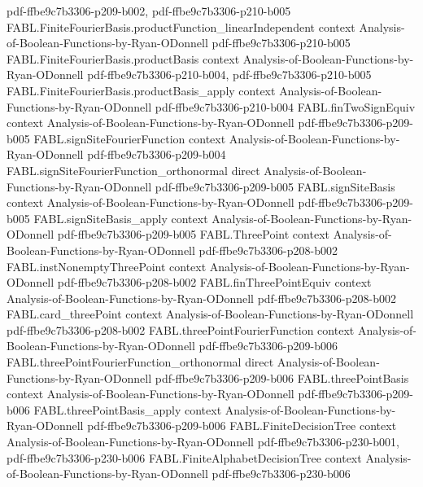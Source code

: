\begin{theorem}
  {pdf-ffbe9c7b3306-p209-b002,
    pdf-ffbe9c7b3306-p210-b005}
\proofstep
  {FABL.FiniteFourierBasis.productFunction_linearIndependent}
  {context}
  {Analysis-of-Boolean-Functions-by-Ryan-ODonnell}
  {pdf-ffbe9c7b3306-p210-b005}
\proofstep
  {FABL.FiniteFourierBasis.productBasis}
  {context}
  {Analysis-of-Boolean-Functions-by-Ryan-ODonnell}
  {pdf-ffbe9c7b3306-p210-b004,
    pdf-ffbe9c7b3306-p210-b005}
\proofstep
  {FABL.FiniteFourierBasis.productBasis_apply}
  {context}
  {Analysis-of-Boolean-Functions-by-Ryan-ODonnell}
  {pdf-ffbe9c7b3306-p210-b004}
\proofstep
  {FABL.finTwoSignEquiv}
  {context}
  {Analysis-of-Boolean-Functions-by-Ryan-ODonnell}
  {pdf-ffbe9c7b3306-p209-b005}
\proofstep
  {FABL.signSiteFourierFunction}
  {context}
  {Analysis-of-Boolean-Functions-by-Ryan-ODonnell}
  {pdf-ffbe9c7b3306-p209-b004}
\proofstep
  {FABL.signSiteFourierFunction_orthonormal}
  {direct}
  {Analysis-of-Boolean-Functions-by-Ryan-ODonnell}
  {pdf-ffbe9c7b3306-p209-b005}
\proofstep
  {FABL.signSiteBasis}
  {context}
  {Analysis-of-Boolean-Functions-by-Ryan-ODonnell}
  {pdf-ffbe9c7b3306-p209-b005}
\proofstep
  {FABL.signSiteBasis_apply}
  {context}
  {Analysis-of-Boolean-Functions-by-Ryan-ODonnell}
  {pdf-ffbe9c7b3306-p209-b005}
\proofstep
  {FABL.ThreePoint}
  {context}
  {Analysis-of-Boolean-Functions-by-Ryan-ODonnell}
  {pdf-ffbe9c7b3306-p208-b002}
\proofstep
  {FABL.instNonemptyThreePoint}
  {context}
  {Analysis-of-Boolean-Functions-by-Ryan-ODonnell}
  {pdf-ffbe9c7b3306-p208-b002}
\proofstep
  {FABL.finThreePointEquiv}
  {context}
  {Analysis-of-Boolean-Functions-by-Ryan-ODonnell}
  {pdf-ffbe9c7b3306-p208-b002}
\proofstep
  {FABL.card_threePoint}
  {context}
  {Analysis-of-Boolean-Functions-by-Ryan-ODonnell}
  {pdf-ffbe9c7b3306-p208-b002}
\proofstep
  {FABL.threePointFourierFunction}
  {context}
  {Analysis-of-Boolean-Functions-by-Ryan-ODonnell}
  {pdf-ffbe9c7b3306-p209-b006}
\proofstep
  {FABL.threePointFourierFunction_orthonormal}
  {direct}
  {Analysis-of-Boolean-Functions-by-Ryan-ODonnell}
  {pdf-ffbe9c7b3306-p209-b006}
\proofstep
  {FABL.threePointBasis}
  {context}
  {Analysis-of-Boolean-Functions-by-Ryan-ODonnell}
  {pdf-ffbe9c7b3306-p209-b006}
\proofstep
  {FABL.threePointBasis_apply}
  {context}
  {Analysis-of-Boolean-Functions-by-Ryan-ODonnell}
  {pdf-ffbe9c7b3306-p209-b006}
\proofstep
  {FABL.FiniteDecisionTree}
  {context}
  {Analysis-of-Boolean-Functions-by-Ryan-ODonnell}
  {pdf-ffbe9c7b3306-p230-b001,
    pdf-ffbe9c7b3306-p230-b006}
\proofstep
  {FABL.FiniteAlphabetDecisionTree}
  {context}
  {Analysis-of-Boolean-Functions-by-Ryan-ODonnell}
  {pdf-ffbe9c7b3306-p230-b006}

\end{theorem}
